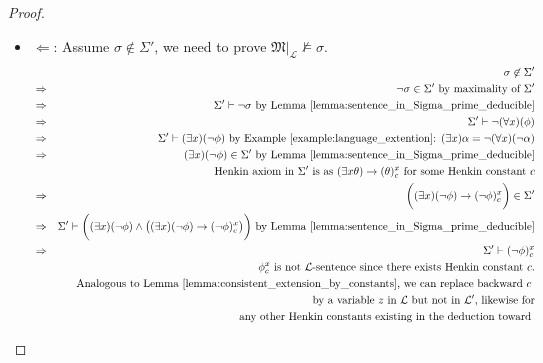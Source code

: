 \documentclass[11pt,letterpaper]{book}
\theoremstyle{definition}
\begin{document}
\begin{enumerate}
{\begin{proof}
\begin{enumerate}
{\begin{itemize}
{To conclude, we know $\sigma \in \Sigma'$, so $\Sigma' \vdash (\forall x
) (\phi)$ by Lemma \ref{lemma:sentence_in_Sigma_prime_deducible}. Also,
by (\ref{def:quantify_axiom_1}), we have $\Sigma' \vdash (\forall x )
(\phi) \rightarrow \phi_t ^x $ since $t$ is variable-free and thus is
substitutable for $x$ in $\phi$. Thus, we have $\Sigma' \vdash \phi_t
^x$, which means $\mathfrak{M}|_{\mathcal{L}} \models \sigma$.

}
\item[]{$\Longleftarrow$: Assume $\sigma \not \in \Sigma'$, we need to
prove $\mathfrak{M}|_{\mathcal{L}} \not \models \sigma$.
\begin{eqnarray*}
& & \sigma \not \in \Sigma' \\
& \Rightarrow & \lnot \sigma \in \Sigma' \text{ by maximality of
$\Sigma'$} \\
& \Rightarrow & \Sigma' \vdash \lnot \sigma \text{ by Lemma
\ref{lemma:sentence_in_Sigma_prime_deducible}} \\
& \Rightarrow & \Sigma' \vdash \lnot (\forall x) ( \phi ) \\
& \Rightarrow & \Sigma' \vdash (\exists x ) (\lnot \phi ) \text{ by
Example \ref{example:language_extention}: $(\exists x) \alpha =
\lnot (\forall x) (\lnot \alpha) $} \\
& \Rightarrow & (\exists x ) (\lnot \phi ) \in \Sigma' \text{ by Lemma
\ref{lemma:sentence_in_Sigma_prime_deducible}} \\
& & \text{ Henkin axiom in $\Sigma'$ is as $(\exists x \theta )
\rightarrow (\theta)_c ^ x$ for some Henkin constant $c$}  \\
& \Rightarrow & \bigg( (\exists x ) (\lnot \phi ) \rightarrow (\lnot
\phi)_c ^x \bigg) \in \Sigma' \\
& \Rightarrow & \Sigma' \vdash \bigg( (\exists x ) (\lnot \phi )  \land
\big( (\exists x ) (\lnot \phi ) \rightarrow (\lnot \phi)_c ^x \big)
\bigg) \text{ by Lemma \ref{lemma:sentence_in_Sigma_prime_deducible}} \\
& \Rightarrow & \Sigma' \vdash (\lnot \phi)_c ^x \\
&  &  \text{ $\phi_c ^x$ is not $\mathcal{L}$-sentence since there
exists Henkin constant $c$.} \\
& & \text{ Analogous to Lemma
\ref{lemma:consistent_extension_by_constants}, we can replace backward
$c$ } \\
& & \text{ by a variable $z$ in $\mathcal{L}$ but not in $\mathcal{L}'$,
likewise for} \\
& & \text{ any other Henkin constants existing in the deduction toward
}
\end{eqnarray*}}
\end{itemize}}
\end{enumerate}
\end{proof}}
\end{enumerate}
\end{document}
